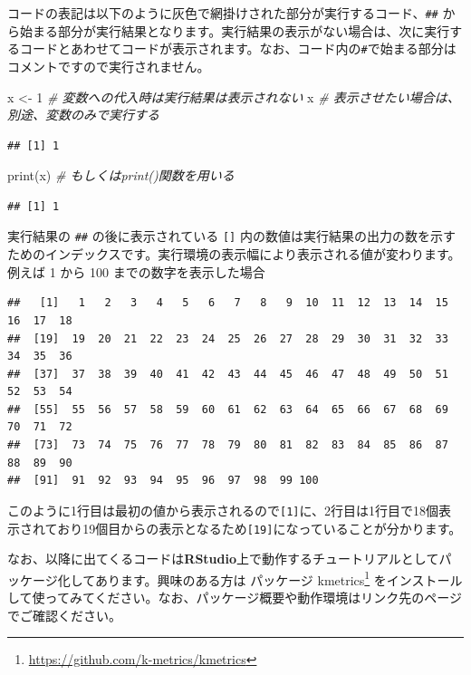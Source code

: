 \documentclass[
  12pt,
]{book}
\newenvironment{Shaded}{\begin{snugshade}}{\end{snugshade}}
\newcommand{\CommentTok}[1]{\textcolor[rgb]{0.56,0.35,0.01}{\textit{#1}}}
\newcommand{\DecValTok}[1]{\textcolor[rgb]{0.00,0.00,0.81}{#1}}
\newcommand{\FunctionTok}[1]{\textcolor[rgb]{0.00,0.00,0.00}{#1}}
\newcommand{\NormalTok}[1]{#1}
\newcommand{\OtherTok}[1]{\textcolor[rgb]{0.56,0.35,0.01}{#1}}
\DeclareRobustCommand{\href}[2]{#2\footnote{\url{#1}}}
\begin{document}
コードの表記は以下のように灰色で網掛けされた部分が実行するコード、\texttt{\#\#} から始まる部分が実行結果となります。実行結果の表示がない場合は、次に実行するコードとあわせてコードが表示されます。なお、コード内の\texttt{\#}で始まる部分はコメントですので実行されません。

\begin{Shaded}
\begin{Highlighting}[numbers=left,,]
\NormalTok{x }\OtherTok{\textless{}{-}} \DecValTok{1}        \CommentTok{\# 変数への代入時は実行結果は表示されない}
\NormalTok{x             }\CommentTok{\# 表示させたい場合は、別途、変数のみで実行する}
\end{Highlighting}
\end{Shaded}

\begin{verbatim}
## [1] 1
\end{verbatim}

\begin{Shaded}
\begin{Highlighting}[numbers=left,,]
\FunctionTok{print}\NormalTok{(x)      }\CommentTok{\# もしくはprint()関数を用いる}
\end{Highlighting}
\end{Shaded}

\begin{verbatim}
## [1] 1
\end{verbatim}

実行結果の \texttt{\#\#} の後に表示されている \texttt{{[}{]}} 内の数値は実行結果の出力の数を示すためのインデックスです。実行環境の表示幅により表示される値が変わります。例えば 1 から 100 までの数字を表示した場合

\begin{verbatim}
##   [1]   1   2   3   4   5   6   7   8   9  10  11  12  13  14  15  16  17  18
##  [19]  19  20  21  22  23  24  25  26  27  28  29  30  31  32  33  34  35  36
##  [37]  37  38  39  40  41  42  43  44  45  46  47  48  49  50  51  52  53  54
##  [55]  55  56  57  58  59  60  61  62  63  64  65  66  67  68  69  70  71  72
##  [73]  73  74  75  76  77  78  79  80  81  82  83  84  85  86  87  88  89  90
##  [91]  91  92  93  94  95  96  97  98  99 100
\end{verbatim}

このように1行目は最初の値から表示されるので\texttt{{[}1{]}}に、2行目は1行目で18個表示されており19個目からの表示となるため\texttt{{[}19{]}}になっていることが分かります。

なお、以降に出てくるコードは\textbf{RStudio}上で動作するチュートリアルとしてパッケージ化してあります。興味のある方は \href{https://github.com/k-metrics/kmetrics}{パッケージ kmetrics} をインストールして使ってみてください。なお、パッケージ概要や動作環境はリンク先のページでご確認ください。
\end{document}
